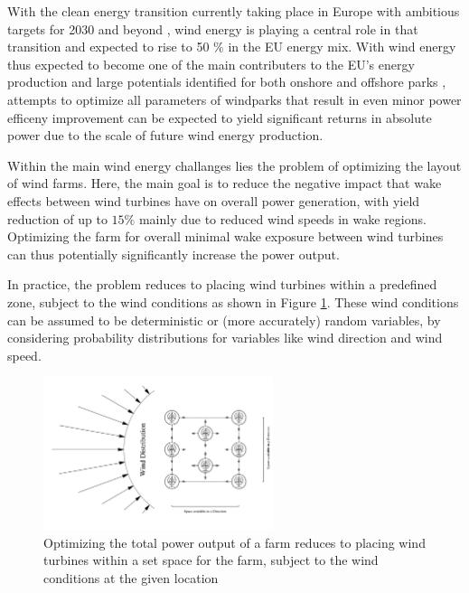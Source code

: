 \documentclass[preprint,12pt]{elsarticle}
\begin{document}
With the clean energy transition currently taking place in Europe with ambitious targets for 2030 and beyond \cite{EU_RE_Targets_2023}, wind energy is playing a central role in that transition and expected to rise to 50 \% in the EU energy mix. \cite{ConsiliumEU_Harnessing_Wind_Power_2024}
With wind energy thus expected to become one of the main contributers to the EU's energy production and large potentials identified for both onshore and offshore parks \cite{EEA_Wind_Energy_Potential_2009}, attempts to optimize all parameters of windparks that result in even minor power efficeny improvement can be expected to yield significant returns in absolute power due to the scale of future wind energy production. 

Within the main wind energy challanges lies the problem of optimizing the layout of wind farms. Here, the main goal is to reduce the negative impact that wake effects between wind turbines have on overall power generation, with yield reduction of up to $15\%$  mainly due to reduced wind speeds in wake regions. Optimizing the farm for overall minimal wake exposure between wind turbines can thus potentially significantly increase the power output. \cite{hou_review_2019} \cite{KIM2024123383} 

In practice, the problem reduces to placing wind turbines within a predefined zone, subject to the wind conditions as shown in Figure \ref{fig:intro_plot}. These wind conditions can be assumed to be deterministic or (more accurately) random variables, by considering probability distributions for variables like wind direction and wind speed.


\begin{figure}[h] 
	\centering
	\includegraphics[width=0.6\textwidth]{../figures/introduction/intro_plot.png} 
	\caption{Optimizing the total power output of a farm reduces to placing wind turbines within a set space for the farm, subject to the wind conditions at the given location}
	\label{fig:intro_plot}
\end{figure}
\end{document}
